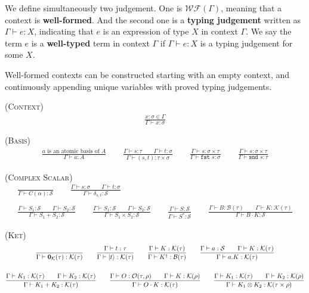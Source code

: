 \documentclass[manuscript, review, timestamp]{acmart}
\newcommand*{\Sc}{\mathcal{S}}
\newcommand*{\K}{\mathcal{K}}
\newcommand*{\B}{\mathcal{B}}
\newcommand*{\Op}{\mathcal{O}}
\newcommand*{\fst}{\texttt{fst }}
\newcommand*{\snd}{\texttt{snd }}
\begin{document}
We define simultaneously two judgement. One is $\mathcal{WF}(\Gamma)$, meaning that a context is \textbf{well-formed}. And the second one is a \textbf{typing judgement} written as $\Gamma \vdash e : X$, indicating that $e$ is an expression of type $X$ in context $\Gamma$.
We say the term $e$ is a \textbf{well-typed} term in context $\Gamma$ if $\Gamma \vdash e : X$ is a typing judgement for some $X$.

Well-formed contexts can be constructed starting with an empty context, and continuously appending unique variables with proved typing judgements.

\textsc{(Context)}
\begin{gather*}
  \frac{x : \sigma \in \Gamma}{\Gamma \vdash x : \sigma}
\end{gather*}

\textsc{(Basis)}
\begin{gather*}
  \frac{a \text{ is an atomic basis of } A}{\Gamma \vdash a : A}
  \qquad
  \frac{\Gamma \vdash s : \tau \qquad \Gamma \vdash t : \sigma}{\Gamma \vdash (s, t) :  \tau \times \sigma }
  \qquad
  \frac{\Gamma \vdash s : \sigma \times \tau }{\Gamma \vdash \fst s : \sigma}
  \qquad
  \frac{\Gamma \vdash s : \sigma \times \tau }{\Gamma \vdash \snd s : \tau}
\end{gather*}

\textsc{(Complex Scalar)}
\begin{gather*}
  \frac{}{\Gamma \vdash C(\alpha) : \Sc}
  \qquad
  \frac{\Gamma \vdash s : \sigma \qquad \Gamma \vdash t : \sigma}{\Gamma \vdash \delta_{s, t} : \Sc} \\
  \\
  \frac{\Gamma \vdash S_1 : \Sc \qquad \Gamma \vdash S_2 : \Sc }{\Gamma \vdash S_1 + S_2 : \Sc }
  \qquad
  \frac{\Gamma \vdash S_1 : \Sc \qquad \Gamma \vdash S_2 : \Sc}{\Gamma \vdash S_1 \times S_2 : \Sc}
  \qquad
  \frac{\Gamma \vdash S : \Sc}{\Gamma \vdash S^* : \Sc}
  \qquad
  \frac{\Gamma \vdash B: \B(\tau) \qquad \Gamma \vdash K : \K(\tau) }{\Gamma \vdash B \cdot K : \Sc }
\end{gather*}

\textsc{(Ket)}
\begin{gather*}
  \frac{}{\Gamma \vdash \mathbf{0}_{\mathcal{K}}(\tau) : \K(\tau)}
  \qquad
  \frac{\Gamma \vdash t : \tau}{\Gamma \vdash \ket{t} : \K(\tau)}
  \qquad
  \frac{\Gamma \vdash K : \K(\tau)}{\Gamma \vdash K^\dagger : \B(\tau)}
  \qquad
  \frac{\Gamma \vdash a : \Sc \qquad \Gamma \vdash K : \K(\tau)}{\Gamma \vdash a . K : \K(\tau)} \\
  \\
  \frac{\Gamma \vdash K_1 : \K(\tau) \qquad \Gamma \vdash K_2 : \K(\tau) }{\Gamma \vdash K_1 + K_2 : \K(\tau) }
  \qquad
  \frac{\Gamma \vdash O : \Op(\tau, \rho) \qquad \Gamma \vdash K : \K(\rho) }{\Gamma \vdash O \cdot K : \K(\tau) }
  \qquad
  \frac{\Gamma \vdash K_1 : \K(\tau) \qquad \Gamma \vdash K_2 : \K(\rho) }{\Gamma \vdash K_1 \otimes K_2 : \K(\tau \times \rho)}
\end{gather*}
\end{document}
